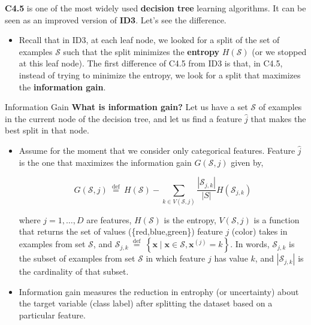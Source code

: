 \documentclass[9pt,dvipsnames]{beamer}
\begin{document}
	\begin{frame}
	\textbf{C4.5} is one of the most widely used \textbf{decision tree} learning algorithms. It can be seen as an improved version of \textbf{ID3}. Let's see the difference. 
	\begin{itemize}
		\item Recall that in ID3, at each leaf node, we looked for a split of the set of examples $\mathcal{S}$ such that the split minimizes the \textbf{entropy} $H(\mathcal{S})$ (or we stopped at this leaf node). The first difference of C4.5 from ID3 is that, in C4.5, instead of trying to minimize the entropy, we look for a split that maximizes the \textbf{information gain}.
	\end{itemize}
	\end{frame}
	
	\begin{frame}{Information Gain}
		\textbf{What is information gain?} Let us have a set $\mathcal{S}$ of examples in the current node of the decision tree, and let us find a feature $\hat{j}$ that makes the best split in that node. 
		\begin{itemize}
			\item Assume for the moment that we consider only categorical features. Feature $\hat{j}$ is the one that maximizes the information gain $G(\mathcal{S}, j)$ given by,
			
			$$
			G(\mathcal{S}, j) \stackrel{\text { def }}{=} H(\mathcal{S})-\sum_{k \in V(\mathcal{S}, j)} \frac{\left|\mathcal{S}_{j, k}\right|}{|S|} H\left(\mathcal{S}_{j, k}\right)
			$$
			
			where $j=1, \ldots, D$ are features, $H(\mathcal{S})$ is the entropy, $V(\mathcal{S}, j)$ is a function that returns the set of values (\{red,blue,green\}) feature $j$ (color) takes in examples from set $\mathcal{S}$, and $\mathcal{S}_{j, k} \stackrel{\text { def }}{=}\left\{\mathbf{x} \mid \mathbf{x} \in \mathcal{S}, \mathbf{x}^{(j)}=k\right\}$. In words, $\mathcal{S}_{j, k}$ is the subset of examples from set $\mathcal{S}$ in which feature $j$ has value $k$, and $\left|\mathcal{S}_{j, k}\right|$ is the cardinality of that subset.
			\item Information gain measures the reduction in entrophy (or uncertainty) about the target variable (class label) after splitting the dataset based on a particular feature.
		\end{itemize}
	\end{frame}
	
\end{document}
